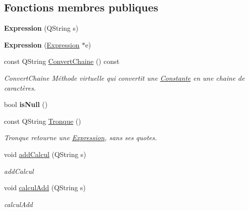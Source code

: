 \subsection*{Fonctions membres publiques}
\begin{DoxyCompactItemize}
\item 
\hypertarget{class_calcul_1_1_expression_a756dc07653593481c4643d6a179d239b}{{\bfseries Expression} (Q\-String s)}\label{class_calcul_1_1_expression_a756dc07653593481c4643d6a179d239b}

\item 
\hypertarget{class_calcul_1_1_expression_a28a8ce64db734d8716f120b284a7e6df}{{\bfseries Expression} (\hyperlink{class_calcul_1_1_expression}{Expression} $\ast$e)}\label{class_calcul_1_1_expression_a28a8ce64db734d8716f120b284a7e6df}

\item 
const Q\-String \hyperlink{class_calcul_1_1_expression_a8bffbb504f9348cd69790c0fe23bf67d}{Convert\-Chaine} () const 
\begin{DoxyCompactList}\small\item\em Convert\-Chaine Méthode virtuelle qui convertit une \hyperlink{class_calcul_1_1_constante}{Constante} en une chaine de caractères. \end{DoxyCompactList}\item 
\hypertarget{class_calcul_1_1_expression_a240d6f19b3c3f3f5eebe3bddaa83f306}{bool {\bfseries is\-Null} ()}\label{class_calcul_1_1_expression_a240d6f19b3c3f3f5eebe3bddaa83f306}

\item 
\hypertarget{class_calcul_1_1_expression_af70b11f7b8fb7fc792df5628b932a117}{const Q\-String \hyperlink{class_calcul_1_1_expression_af70b11f7b8fb7fc792df5628b932a117}{Tronque} ()}\label{class_calcul_1_1_expression_af70b11f7b8fb7fc792df5628b932a117}

\begin{DoxyCompactList}\small\item\em Tronque retourne une \hyperlink{class_calcul_1_1_expression}{Expression}, sans ses quotes. \end{DoxyCompactList}\item 
void \hyperlink{class_calcul_1_1_expression_ac093ea5837a113f64be91e66b055b18b}{add\-Calcul} (Q\-String s)
\begin{DoxyCompactList}\small\item\em add\-Calcul \end{DoxyCompactList}\item 
void \hyperlink{class_calcul_1_1_expression_a0e762d07570ac388d0919a4c2053eecd}{calcul\-Add} (Q\-String s)
\begin{DoxyCompactList}\small\item\em calcul\-Add \end{DoxyCompactList}\end{DoxyCompactItemize}


